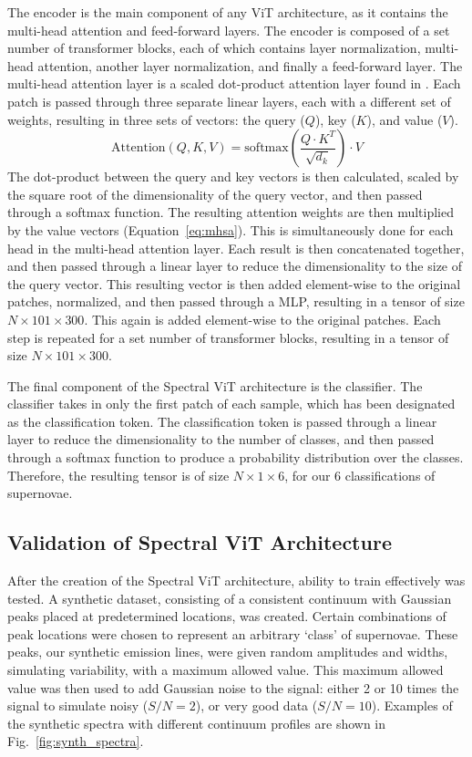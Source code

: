 The encoder is the main component of any ViT architecture, as it contains the 
multi-head attention and feed-forward layers. The encoder is composed of a set number of
transformer blocks, each of which contains layer normalization, multi-head attention, another 
layer normalization, and finally a feed-forward layer. The multi-head attention layer 
is a scaled dot-product attention layer found in \textcite{vaswani2017}. Each patch 
is passed through three separate linear layers, each with a different set of weights, 
resulting in three sets of vectors: the query ($Q$), key ($K$), and value ($V$).
\begin{equation}
    \label{eq:mhsa}
    \text{Attention}(Q, K, V) = \text{softmax}\left(\frac{Q\cdot K^T}{\sqrt{d_k}}\right)\cdot V
\end{equation}
The dot-product between the query and key vectors is then calculated,
scaled by the square root of the dimensionality of the query vector, and then passed through a softmax function.
The resulting attention weights are then multiplied by the value vectors (Equation~\ref{eq:mhsa}). 
This is simultaneously done for each head in the multi-head attention layer. Each result is then 
concatenated together, and then passed through a linear layer to reduce the dimensionality
to the size of the query vector. This resulting vector is then added
element-wise to the original patches, normalized, and then passed through a MLP, 
resulting in a tensor of size $N \times 101 \times 300$. This again is added element-wise to the original patches. 
Each step is repeated for a set number of transformer blocks, resulting in a tensor of size
$N \times 101 \times 300$.

The final component of the Spectral ViT architecture is the classifier. The classifier
takes in only the first patch of each sample, which has been designated as the classification token.
The classification token is passed through a linear layer to reduce the dimensionality to the
number of classes, and then passed through a softmax function to produce a probability distribution
over the classes. Therefore, the resulting tensor is of size $N \times 1 \times 6$, for our 
6 classifications of supernovae.

\subsection{Validation of Spectral ViT Architecture}
\label{ssec:validation}
After the creation of the Spectral ViT architecture, ability to train effectively 
was tested. A synthetic dataset, consisting of a consistent continuum with 
Gaussian peaks placed at predetermined locations, was created. Certain combinations of 
peak locations were chosen to represent an arbitrary `class' of supernovae. These peaks, 
our synthetic emission lines, were given random amplitudes and widths, simulating  
variability, with a maximum allowed value. This maximum allowed value was then used to add 
Gaussian noise to the signal: either 2 or 10 times the signal to simulate noisy ($S/N=2$),
or very good data ($S/N=10$). Examples of the synthetic spectra with different continuum profiles 
are shown in Fig.~\ref{fig:synth_spectra}. 

